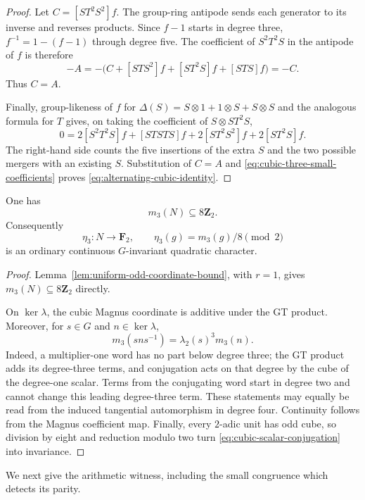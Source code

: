 \begin{proof}
Let $C=[ST^2S^2]f$.  The group-ring antipode sends each generator to
its inverse and reverses products.  Since $f-1$ starts in degree three,
$f^{-1}=1-(f-1)$ through degree five.  The coefficient of $S^2T^2S$
in the antipode of $f$ is therefore
\[
 -A=-\bigl(C+[STS^2]f+[ST^2S]f+[STS]f\bigr)=-C.
\]
Thus $C=A$.

Finally, group-likeness of $f$ for
$\Delta(S)=S\otimes1+1\otimes S+S\otimes S$ and the analogous
formula for $T$ gives, on taking the coefficient of
$S\otimes ST^2S$,
\[
 0=2[S^2T^2S]f+[STSTS]f+2[ST^2S^2]f+2[ST^2S]f.
\]
The right-hand side counts the five insertions of the extra $S$ and
the two possible mergers with an existing $S$.  Substitution of
$C=A$ and \eqref{eq:cubic-three-small-coefficients} proves
\eqref{eq:alternating-cubic-identity}.
\end{proof}

\begin{proposition}
\label{prop:cubic-magnus-eight}
One has
\[
 m_3(N)\subseteq8\mathbf Z_2.
\]
Consequently
\[
 \eta_3:N\longrightarrow\mathbf F_2,
 \qquad \eta_3(g)=m_3(g)/8\pmod2
\]
is an ordinary continuous $G$-invariant quadratic character.
\end{proposition}

\begin{proof}
Lemma~\ref{lem:uniform-odd-coordinate-bound}, with $r=1$, gives
$m_3(N)\subseteq8\mathbf Z_2$ directly.

On $\ker\lambda$, the cubic Magnus coordinate is additive under the
GT product.  Moreover, for $s\in G$ and $n\in\ker\lambda$,
\begin{equation}\label{eq:cubic-scalar-conjugation}
 m_3(sns^{-1})=\lambda_2(s)^3m_3(n).
\end{equation}
Indeed, a multiplier-one word has no part below degree three; the
GT product adds its degree-three terms, and conjugation acts on that
degree by the cube of the degree-one scalar.  Terms from the
conjugating word start in degree two and cannot change this leading
degree-three term.  These statements may equally be read from the
induced tangential automorphism in degree four.  Continuity follows
from the Magnus coefficient map.  Finally, every $2$-adic unit has
odd cube, so division by eight and reduction modulo two turn
\eqref{eq:cubic-scalar-conjugation} into invariance.
\end{proof}

We next give the arithmetic witness, including the small congruence
which detects its parity.

